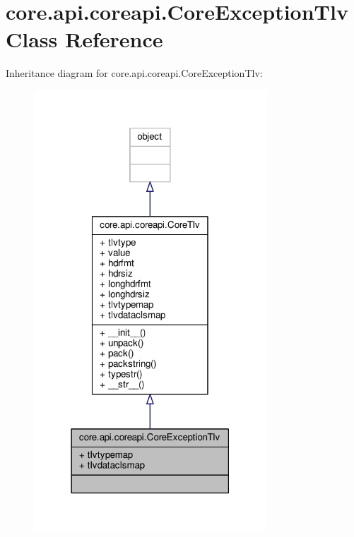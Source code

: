 \hypertarget{classcore_1_1api_1_1coreapi_1_1_core_exception_tlv}{\section{core.\+api.\+coreapi.\+Core\+Exception\+Tlv Class Reference}
\label{classcore_1_1api_1_1coreapi_1_1_core_exception_tlv}
}


Inheritance diagram for core.\+api.\+coreapi.\+Core\+Exception\+Tlv\+:
\nopagebreak
\begin{figure}[H]
\begin{center}
\leavevmode
\includegraphics[width=247pt]{classcore_1_1api_1_1coreapi_1_1_core_exception_tlv__inherit__graph}
\end{center}
\end{figure}


